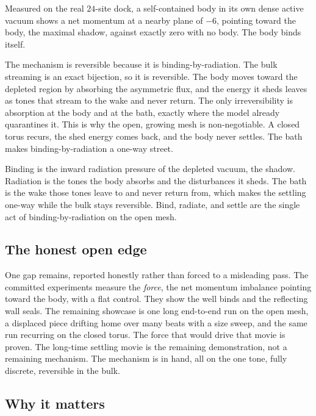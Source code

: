 Measured on the real $24$-site dock, a self-contained body in its own dense active vacuum shows a net momentum at
a nearby plane of $-6$, pointing toward the body, the maximal shadow, against exactly zero with no body. The body
binds itself.

The mechanism is reversible because it is binding-by-radiation. The bulk streaming is an exact bijection, so it is
reversible. The body moves toward the depleted region by absorbing the asymmetric flux, and the energy it sheds
leaves as tones that stream to the wake and never return. The only irreversibility is absorption at the body and
at the bath, exactly where the model already quarantines it. This is why the open, growing mesh is non-negotiable.
A closed torus recurs, the shed energy comes back, and the body never settles. The bath makes
binding-by-radiation a one-way street.

\begin{principle}
Binding is the inward radiation pressure of the depleted vacuum, the shadow. Radiation is the tones the body
absorbs and the disturbances it sheds. The bath is the wake those tones leave to and never return from, which
makes the settling one-way while the bulk stays reversible. Bind, radiate, and settle are the single act of
binding-by-radiation on the open mesh.
\end{principle}

\subsection{The honest open edge}

One gap remains, reported honestly rather than forced to a misleading pass. The committed experiments measure the
\emph{force}, the net momentum imbalance pointing toward the body, with a flat control. They show the well binds
and the reflecting wall seals. The remaining showcase is one long end-to-end run on the open mesh, a displaced
piece drifting home over many beats with a size sweep, and the same run recurring on the closed torus. The force
that would drive that movie is proven. The long-time settling movie is the remaining demonstration, not a
remaining mechanism. The mechanism is in hand, all on the one tone, fully discrete, reversible in the bulk.

\subsection{Why it matters}


